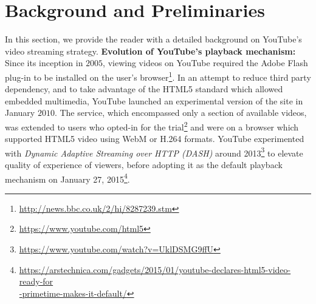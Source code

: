 \section{Background and Preliminaries}
\label{chap03sec:background}
In this section, we provide the reader with a detailed background on YouTube's video streaming strategy.
{\bf Evolution of YouTube's playback mechanism:} Since its inception in $2005$, viewing videos on YouTube required the Adobe Flash plug-in to be installed on the user's browser\footnote{\url{http://news.bbc.co.uk/2/hi/8287239.stm}}.
In an attempt to reduce third party dependency, and to take advantage of the HTML5 standard which allowed embedded multimedia, YouTube launched an experimental version of the site in January $2010$.
The service, which encompassed only a section of available videos, was extended to users who opted-in for the trial\footnote{\url{https://www.youtube.com/html5}} and were on a browser which supported HTML5 video using WebM or H.264 formats.
YouTube experimented with {\it Dynamic Adaptive Streaming over HTTP (DASH)} around 2013\footnote{\url{https://www.youtube.com/watch?v=UklDSMG9ffU}} to elevate quality of experience of viewers, before adopting it as the default playback mechanism on January 27, 2015\footnote{\url{https://arstechnica.com/gadgets/2015/01/youtube-declares-html5-video-ready-for}\\\url{-primetime-makes-it-default/}}.

